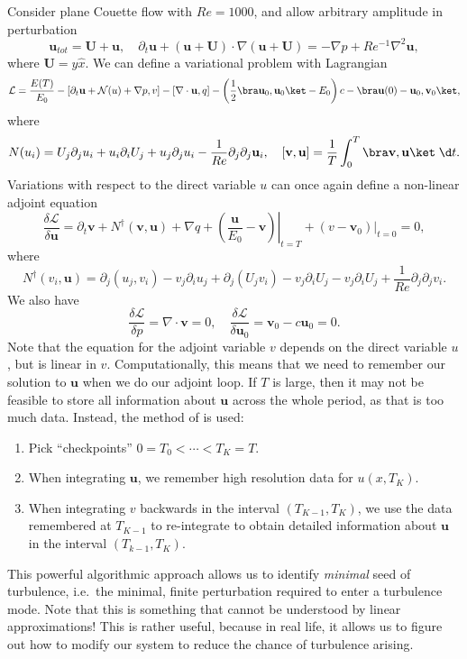 \documentclass[a4paper]{article}
\begin{document}
Consider plane Couette flow with $Re = 1000$, and allow arbitrary amplitude in perturbation
\[
  \mathbf{u}_{tot} = \mathbf{U} + \mathbf{u},\quad \partial_t \mathbf{u} + (\mathbf{u} + \mathbf{U}) \cdot \nabla (\mathbf{u} + \mathbf{U}) = - \nabla p + Re^{-1} \nabla^2 \mathbf{u},
\]
where $\mathbf{U} = y\hat{x}$. We can define a variational problem with Lagrangian
\[
  \mathcal{L} = \frac{E(T)}{E_0} - [\partial_t \mathbf{u} + \mathcal{N}(u) + \nabla p, v] - [\nabla \cdot \mathbf{u}, q] - \left(\frac{1}{2} \bra \mathbf{u}_0, \mathbf{u}_0\ket - E_0\right) c - \bra \mathbf{u}(0) - \mathbf{u}_0, \mathbf{v}_0\ket,
\]
where
\[
  N(u_i) = U_j \partial_j u_i + u_i \partial_i U_j + u_j \partial_j u_i - \frac{1}{Re} \partial_j \partial_j \mathbf{u}_i,\quad [\mathbf{v}, \mathbf{u}] = \frac{1}{T} \int_0^T \bra \mathbf{v}, \mathbf{u}\ket\;\d t.
\]
Variations with respect to the direct variable $u$ can once again define a non-linear adjoint equation
\[
  \frac{\delta \mathcal{L}}{\delta \mathbf{u}} = \partial_t \mathbf{v} + N^\dagger (\mathbf{v}, \mathbf{u}) + \nabla q + \left.\left(\frac{\mathbf{u}}{E_0} - \mathbf{v}\right)\right|_{t = T} + (v - \mathbf{v}_0)|_{t = 0} = 0,
\]
where
\[
  N^\dagger (v_i, \mathbf{u}) = \partial_j (u_j, v_i) - v_j \partial_i u_j + \partial_j (U_j v_i) - v_j \partial_i U_j - v_j \partial_i U_j + \frac{1}{Re} \partial_j \partial_j v_i.
\]
We also have
\[
  \frac{\delta \mathcal{L}}{\delta p} = \nabla \cdot \mathbf{v} = 0,\quad \frac{\delta \mathcal{L}}{\delta \mathbf{u}_0} = \mathbf{v}_0 - c \mathbf{u}_0 = 0.
\]
Note that the equation for the adjoint variable $v$ depends on the direct variable $u$, but is linear in $v$. Computationally, this means that we need to remember our solution to $\mathbf{u}$ when we do our adjoint loop. If $T$ is large, then it may not be feasible to store all information about $\mathbf{u}$ across the whole period, as that is too much data. Instead, the method of  is used:
\begin{enumerate}
  \item Pick ``checkpoints'' $0 = T_0 < \cdots < T_K = T$.
  \item When integrating $\mathbf{u}$, we remember high resolution data for $u(x, T_K)$.
  \item When integrating $v$ backwards in the interval $(T_{K - 1}, T_K)$, we use the data remembered at $T_{K - 1}$ to re-integrate to obtain detailed information about $\mathbf{u}$ in the interval $(T_{k - 1}, T_K)$.
\end{enumerate}
This powerful algorithmic approach allows us to identify \emph{minimal} seed of turbulence, i.e.\ the minimal, finite perturbation required to enter a turbulence mode. Note that this is something that cannot be understood by linear approximations! This is rather useful, because in real life, it allows us to figure out how to modify our system to reduce the chance of turbulence arising.

\printindex
\end{document}
